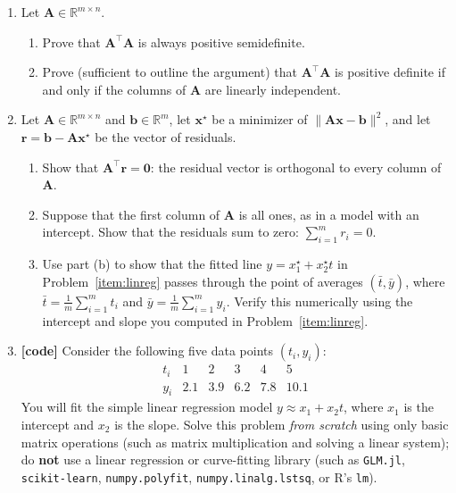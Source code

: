 \documentclass[letterpaper]{article}
\newcommand{\Real}{\mathbb{R}}
\newcommand{\tr}{^\top}
\newcommand{\opt}{^\star}
\begin{document}
\begin{enumerate}
\item Let $\bm{A}\in \Real^{m \times n}$.
\begin{enumerate}
\item Prove that $\bm{A}\tr \bm{A}$ is always positive semidefinite.
\item Prove (sufficient to outline the argument) that $\bm{A}\tr \bm{A}$ is positive definite if and only if the columns of $\bm{A}$ are linearly independent.
\end{enumerate}
\item Let $\bm{A} \in \Real^{m\times n}$ and $\bm{b} \in \Real^m$, let $\bm{x}\opt$ be a minimizer of $\| \bm{A} \bm{x} - \bm{b}\|^{2}$, and let $\bm{r} = \bm{b} - \bm{A}\bm{x}\opt$ be the vector of residuals.
  \begin{enumerate}
  \item Show that $\bm{A}\tr \bm{r} = \bm{0}$: the residual vector is orthogonal to every column of $\bm{A}$.
  \item Suppose that the first column of $\bm{A}$ is all ones, as in a model with an intercept. Show that the residuals sum to zero: $\sum_{i=1}^m r_i = 0$.
  \item Use part (b) to show that the fitted line $y = x_1\opt + x_2\opt t$ in Problem~\ref{item:linreg} passes through the point of averages $(\bar{t}, \bar{y})$, where $\bar{t} = \frac{1}{m}\sum_{i=1}^m t_i$ and $\bar{y} = \frac{1}{m}\sum_{i=1}^m y_i$. Verify this numerically using the intercept and slope you computed in Problem~\ref{item:linreg}.
  \end{enumerate}
\item \textbf{[code]} \label{item:linreg} Consider the following five data points $(t_i, y_i)$:
  \[
    \begin{array}{c|ccccc}
      t_i & 1 & 2 & 3 & 4 & 5 \\ \hline
      y_i & 2.1 & 3.9 & 6.2 & 7.8 & 10.1
    \end{array}
  \]
  You will fit the simple linear regression model $y \approx x_1 + x_2 t$, where $x_1$ is the intercept and $x_2$ is the slope. Solve this problem \emph{from scratch} using only basic matrix operations (such as matrix multiplication and solving a linear system); do \textbf{not} use a linear regression or curve-fitting library (such as \texttt{GLM.jl}, \texttt{scikit-learn}, \texttt{numpy.polyfit}, \texttt{numpy.linalg.lstsq}, or R's \texttt{lm}).

\end{enumerate}
\end{document}
